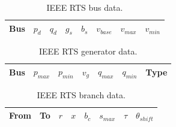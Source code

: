 
\begin{table}[h]
\caption{IEEE RTS bus data.}
\label{tbl:rtsbus}
\begin{center}
\begin{tabular}{c|c|c|c|c|c|c|c}
\hline
Bus &$p_d$ &$q_d$ &$g_s$ &$b_s$ &$v_{base}$ &$v_{max}$ &$v_{min}$\\
\hline\hline

\hline
\end{tabular}
\end{center}
\end{table}

\begin{table}[h]
\caption{IEEE RTS generator data.}
\label{tbl:rtsgen}
\begin{center}
\begin{tabular}{c|c|c|c|c|c|c}
\hline
Bus &$p_{max}$ &$p_{min}$ &$v_g$ &$q_{max}$ &$q_{min}$ &Type\\
\hline\hline

\hline
\end{tabular}
\end{center}
\end{table}

\begin{table}[h]
\caption{IEEE RTS branch data.}
\label{tbl:rtsbranch}
\begin{center}
\begin{tabular}{c|c|c|c|c|c|c|c}
\hline
From &To &$r$ &$x$ &$b_c$ &$s_{max}$ &$\tau$ &$\theta_{shift}$\\
\hline\hline

\hline
\end{tabular}
\end{center}
\end{table}

% 
